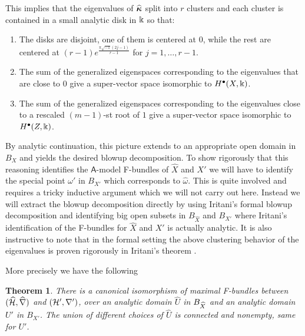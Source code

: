 \documentclass[twoside,leqno]{article}
\numberwithin{equation}{section}
\theoremstyle{plain}
\newtheorem{theorem}[equation]{Theorem}
\theoremstyle{definition}
\begin{document}
This implies that the eigenvalues of $\widehat{\boldsymbol{\kappa}}$ split into $r$ clusters and each cluster is contained  in a small analytic disk in $\Bbbk$ so that:

\begin{enumerate}[wide]
\item The disks are disjoint, one of them is centered at $0$,
while the rest are centered at \linebreak 
$(r-1)e^{\frac{\pi \sqrt{-1}(2j-1)}{r-1}}$ for $j=1,\dots,r-1$.
\item The sum of the generalized eigenspaces corresponding to
the eigenvalues that are close to $0$ give a super-vector space
isomorphic to  $H^{\bullet}(X,\Bbbk)$.
\item The sum of the generalized eigenspaces corresponding to the
eigenvalues  close to a rescaled $(m -
    1)$-st root of $1$ give a super-vector space isomorphic
to $H^{\bullet}(Z,\Bbbk)$.
\end{enumerate}


By analytic continuation, this picture extends to an appropriate open domain in $B_{X}$ and yields the desired blowup decomposition. To show rigorously that this reasoning identifies the $\mathsf{A}$-model F-bundles of $\widehat{X}$ and $X'$ we will have to identify the special point $\omega'$ in $B_{X'}$ which corresponds to $\widehat{\omega}$. This is quite involved and requires a tricky inductive argument which we will not carry out here. Instead we will extract the blowup decomposition directly by using Iritani's formal blowup decomposition \cite{Iritani_blowup} and identifying big open subsets in $B_{\widehat{X}}$  and $B_{X'}$ where Iritani's identification of the F-bundles 
 for $\widehat{X}$ and $X'$ is actually analytic. It is also instructive to note that in the formal setting the above clustering behavior of the eigenvalues is proven rigorously in Iritani's theorem \cite[Theorem~5.8(6)]{Iritani_blowup}.

\medskip

More precisely we have the following

\begin{theorem} \label{thm:blowup}
  There is a canonical isomorphism of maximal F-bundles between $(\widehat{\mathcal H}, \widehat{\nabla})$ and $(\mathcal H', \nabla')$, over an analytic domain $\widehat{U}$ in $B_{\widehat{X}}$ and an analytic domain $U'$ in $B_{X'}$.
  The union of different choices of $\widehat{U}$ is connected and nonempty, same for $U'$.
\end{theorem}
\end{document}

